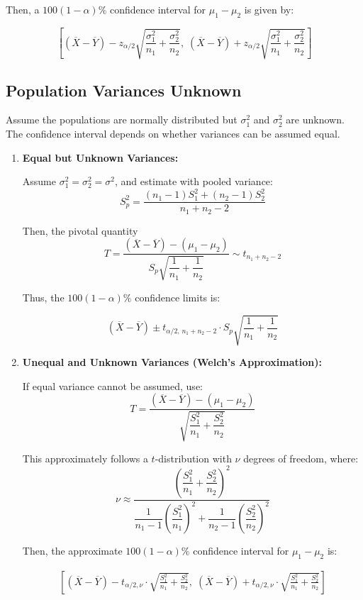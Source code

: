 \documentclass[twoside]{book}
\begin{document}
Then, a \(100(1 - \alpha)\%\) confidence interval for \(\mu_1 - \mu_2\) is given by:
\begin{textbox}
\[
\left[
(\overline{X} - \overline{Y}) - z_{\alpha/2} \sqrt{\frac{\sigma_1^2}{n_1} + \frac{\sigma_2^2}{n_2}}, \;
(\overline{X} - \overline{Y}) + z_{\alpha/2} \sqrt{\frac{\sigma_1^2}{n_1} + \frac{\sigma_2^2}{n_2}}
\right]
\]
\end{textbox}

\subsection{Population Variances Unknown}

Assume the populations are normally distributed but \(\sigma_1^2\) and \(\sigma_2^2\) are unknown. The confidence interval depends on whether variances can be assumed equal.

\begin{enumerate}[label=(\roman*)]
	\item \textbf{Equal but Unknown Variances:}

Assume \(\sigma_1^2 = \sigma_2^2 = \sigma^2\), and estimate with pooled variance:
\[
S_p^2 = \frac{(n_1 - 1)S_1^2 + (n_2 - 1)S_2^2}{n_1 + n_2 - 2}
\]

Then, the pivotal quantity
\[
T = \frac{(\overline{X} - \overline{Y}) - (\mu_1 - \mu_2)}{S_p \sqrt{\dfrac{1}{n_1} + \dfrac{1}{n_2}}} \sim t_{n_1 + n_2 - 2}
\]

Thus, the \(100(1 - \alpha)\%\) confidence limits is:
\begin{textbox}
\[
(\overline{X} - \overline{Y}) \pm t_{\alpha/2, \, n_1 + n_2 - 2} \cdot S_p \sqrt{\frac{1}{n_1} + \frac{1}{n_2}}
\]
\end{textbox}

\item \textbf{Unequal and Unknown Variances (Welch's Approximation):}

If equal variance cannot be assumed, use:
\[
T = \dfrac{(\overline{X} - \overline{Y}) - (\mu_1 - \mu_2)}{\sqrt{\dfrac{S_1^2}{n_1} + \dfrac{S_2^2}{n_2}}}
\]

This approximately follows a \(t\)-distribution with $\nu$ degrees of freedom, where:
\[
\nu \approx \dfrac{\left( \dfrac{S_1^2}{n_1} + \dfrac{S_2^2}{n_2} \right)^2}{\dfrac{1}{n_1 - 1}\left(\dfrac{S_1^2}{n_1} \right)^2 + \dfrac{1}{n_2 - 1}\left( \dfrac{S_2^2}{n_2}\right)^2}
\]

Then, the approximate \(100(1 - \alpha)\%\) confidence interval for \(\mu_1 - \mu_2\) is:
\begin{textbox}
\begin{align*}
\left[
(\overline{X} - \overline{Y}) - t_{\alpha/2, \nu} \cdot \sqrt{\frac{S_1^2}{n_1} + \frac{S_2^2}{n_2}}, \;
(\overline{X} - \overline{Y}) + t_{\alpha/2, \nu} \cdot \sqrt{\frac{S_1^2}{n_1} + \frac{S_2^2}{n_2}}
\right]
\end{align*}
\end{textbox}
\end{enumerate}
\end{document}
